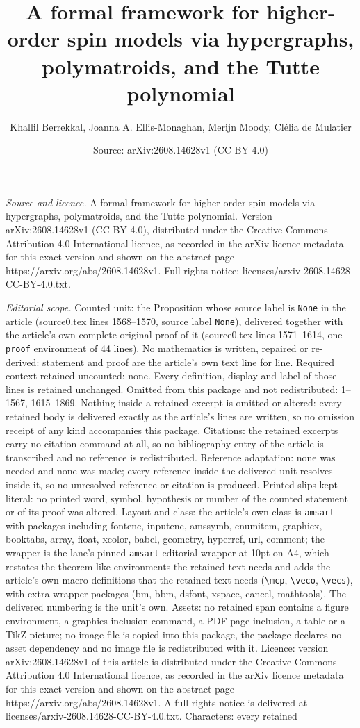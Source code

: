 \documentclass[10pt,a4paper]{amsart}
\title[A formal framework for higher-order spin models via hypergra]{A formal framework for higher-order spin models via hypergraphs, polymatroids, and the Tutte polynomial}
\author{Khallil Berrekkal, Joanna A. Ellis-Monaghan, Merijn Moody, Cl\'elia de Mulatier}
\date{Source: arXiv:2608.14628v1 (CC BY 4.0)}
\begin{document}
\maketitle

\noindent\emph{Source and licence.} A formal framework for higher-order spin models via hypergraphs, polymatroids, and the Tutte polynomial. Version arXiv:2608.14628v1 (CC BY 4.0), distributed under the Creative Commons Attribution 4.0 International licence, as recorded in the arXiv licence metadata for this exact version and shown on the abstract page https://arxiv.org/abs/2608.14628v1. Full rights notice: licenses/arxiv-2608.14628-CC-BY-4.0.txt.\par\smallskip

\noindent\textit{Editorial scope.} Counted unit: the Proposition whose source label is \texttt{None} in the article (source0.tex lines 1568--1570, source label \texttt{None}), delivered together with the article's own complete original proof of it (source0.tex lines 1571--1614, one \texttt{proof} environment of 44 lines). No mathematics is written, repaired or re-derived: statement and proof are the article's own text line for line. Required context retained uncounted: none. Every definition, display and label of those lines is retained unchanged. Omitted from this package and not redistributed: 1--1567, 1615--1869. Nothing inside a retained excerpt is omitted or altered: every retained body is delivered exactly as the article's lines are written, so no omission receipt of any kind accompanies this package. Citations: the retained excerpts carry no citation command at all, so no bibliography entry of the article is transcribed and no reference is redistributed. Reference adaptation: none was needed and none was made; every reference inside the delivered unit resolves inside it, so no unresolved reference or citation is produced. Printed slips kept literal: no printed word, symbol, hypothesis or number of the counted statement or of its proof was altered. Layout and class: the article's own class is \texttt{amsart} with packages including fontenc, inputenc, amssymb, enumitem, graphicx, booktabs, array, float, xcolor, babel, geometry, hyperref, url, comment; the wrapper is the lane's pinned \texttt{amsart} editorial wrapper at 10pt on A4, which restates the theorem-like environments the retained text needs and adds the article's own macro definitions that the retained text needs (\texttt{\textbackslash mcp}, \texttt{\textbackslash veco}, \texttt{\textbackslash vecs}), with extra wrapper packages (bm, bbm, dsfont, xspace, cancel, mathtools). The delivered numbering is the unit's own. Assets: no retained span contains a figure environment, a graphics-inclusion command, a PDF-page inclusion, a table or a TikZ picture; no image file is copied into this package, the package declares no asset dependency and no image file is redistributed with it. Licence: version arXiv:2608.14628v1 of this article is distributed under the Creative Commons Attribution 4.0 International licence, as recorded in the arXiv licence metadata for this exact version and shown on the abstract page https://arxiv.org/abs/2608.14628v1. A full rights notice is delivered at licenses/arxiv-2608.14628-CC-BY-4.0.txt. Characters: every retained 
\end{document}
